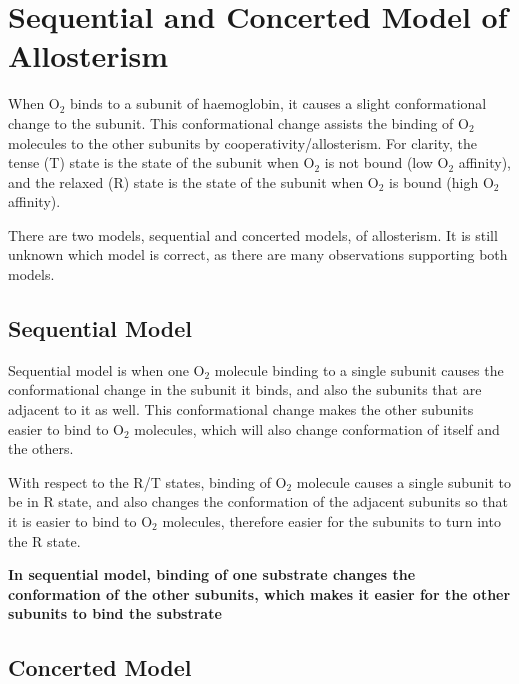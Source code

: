 \begin{center}
\end{center}

\section{Sequential and Concerted Model of \-Allosterism}

When O$_2$ binds to a subunit of haemoglobin, it causes a slight conformational change to the subunit.
This conformational change assists the binding of O$_2$ molecules to the other subunits by cooperativity/allosterism.
For clarity, the tense (T) state is the state of the subunit when O$_2$ is not bound (low O$_2$ affinity), and the relaxed (R) state is the state of the subunit when O$_2$ is bound (high O$_2$ affinity).

There are two models, sequential and concerted models, of allosterism.
It is still unknown which model is correct, as there are many observations supporting both models.

\subsection{Sequential Model}

Sequential model is when one O$_2$ molecule binding to a single subunit causes the conformational change in the subunit it binds, and also the subunits that are adjacent to it as well.
This conformational change makes the other subunits easier to bind to O$_2$ molecules, which will also change conformation of itself and the others.

With respect to the R/T states, binding of O$_2$ molecule causes a single subunit to be in R state, and also changes the conformation of the adjacent subunits so that it is easier to bind to O$_2$ molecules, therefore easier for the subunits to turn into the R state.

\begin{center}
\end{center}

\textbf{In sequential model, binding of one substrate changes the conformation of the other subunits, which makes it easier for the other subunits to bind the substrate}

\subsection{Concerted Model}

